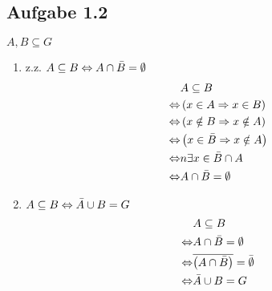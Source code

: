 \subsection{Aufgabe 1.2}
$A, B \subseteq G$
\begin{enumerate}[label=\alph*)]
\item \ac{z.z.} $A \subseteq B \Leftrightarrow A \cap \bar{B} = \emptyset$\\
	\begin{align*}
	&A \subseteq B\\
	\Leftrightarrow & \left(x \in A \Rightarrow x \in B\right)\\
	\Leftrightarrow & \left(x \notin B \Rightarrow x \notin A\right)\\
	\Leftrightarrow & \left(x \in \bar{B} \Rightarrow x \notin A\right)\\
	\Leftrightarrow & n \exists x \in \bar{B} \cap A\\
	\Leftrightarrow & A \cap \bar{B} = \emptyset
	\end{align*}

\item $A \subseteq B \Leftrightarrow \bar{A} \cup B = G$
	\begin{align*}
	&A \subseteq B\\
	\Leftrightarrow & A \cap \bar{B} = \emptyset\\
	\Leftrightarrow & \overline{\left(A \cap \bar{B}\right)} = \bar{\emptyset}\\
	\Leftrightarrow & \bar{A} \cup B = G
	\end{align*}
\end{enumerate}

